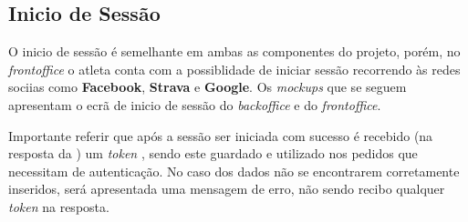 \subsection{Inicio de Sessão}


O inicio de sessão é semelhante em ambas as componentes do projeto, porém, no \textit{frontoffice} o atleta conta com a possiblidade de iniciar sessão recorrendo às redes sociias como \textbf{Facebook}, \textbf{Strava} e \textbf{Google}. Os \textit{mockups} que se seguem apresentam o ecrã de inicio de sessão do \textit{backoffice} e do \textit{frontoffice}.



Importante referir que após a sessão ser iniciada com sucesso é recebido (na resposta da ) um \textit{token} \textbf{}, sendo este guardado e utilizado nos pedidos que necessitam de autenticação. No caso dos dados não se encontrarem corretamente inseridos, será apresentada uma mensagem de erro, não sendo recibo qualquer \textit{token} na resposta.